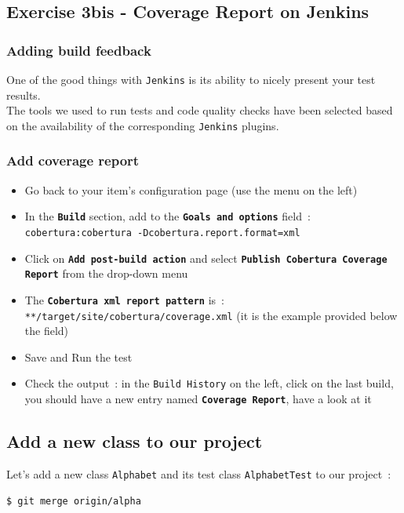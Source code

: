 \documentclass{article}
\begin{document}
\subsection{Exercise 3bis - Coverage Report on Jenkins}

\subsubsection{Adding build feedback}
One of the good things with \texttt{Jenkins} is its ability to nicely present your test results. \\
The tools we used to run tests and code quality checks have been selected based on the availability of the corresponding \texttt{Jenkins} plugins.

\subsubsection{Add coverage report}
\begin{itemize}
\item Go back to your item's configuration page (use the menu on the left)
\item In the \textbf{\texttt{Build}} section, add to the \textbf{\texttt{Goals and options}} field~: \\
\texttt{cobertura:cobertura -Dcobertura.report.format=xml}
\item Click on \textbf{\texttt{Add post-build action}} and select \textbf{\texttt{Publish Cobertura Coverage Report}} from the drop-down menu
\item The \textbf{\texttt{Cobertura xml report pattern}} is~:\\
\texttt{**/target/site/cobertura/coverage.xml} (it is the example provided below the field)
\item Save and Run the test
\item Check the output~: in the \texttt{Build History} on the left, click on the last build, you should have a new entry named \textbf{\texttt{Coverage Report}}, have a look at it
\end{itemize}



\subsection{Add a new class to our project}

Let's add a new class \texttt{Alphabet} and its test class \texttt{AlphabetTest} to our project~:
\begin{lstlisting}
$ git merge origin/alpha
\end{lstlisting}
\end{document}
